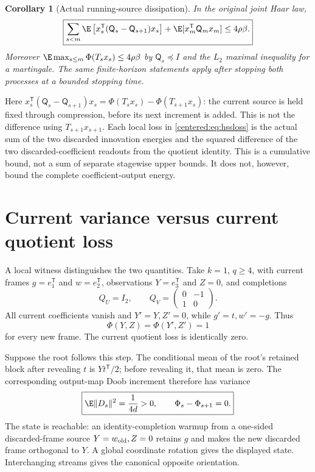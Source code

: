 \documentclass[11pt,oneside,openany,a4paper]{book}
\numberwithin{equation}{chapter}
\newtheorem{corollary}[theorem]{Corollary}
\theoremstyle{definition}
\theoremstyle{remark}
\begin{document}
\begin{corollary}[Actual running-source dissipation]\label{centered:cor:loss}
In the original joint Haar law,
\begin{equation}\label{centered:eq:hssloss}
 \boxed{\sum_{s<m}\E\left[x_s^{\mathsf T}(\mathsf Q_s-\mathsf Q_{s+1})x_s\right]
 +\E[x_m^{\mathsf T}\mathsf Q_mx_m]\le4\rho\beta.}
\end{equation}
Moreover $\E\max_{s\le m}\Phi(T_sx_s)\le4\rho\beta$ by $\mathsf Q_s\preceq I$ and the $L_2$ maximal inequality for a martingale. The same finite-horizon statements apply after stopping both processes at a bounded stopping time.
\end{corollary}

Here $x_s^{\mathsf T}(\mathsf Q_s-\mathsf Q_{s+1})x_s=\Phi(T_sx_s)-\Phi(T_{s+1}x_s)$: the current source is held fixed through compression, before its next increment is added. This is not the difference using $T_{s+1}x_{s+1}$. Each local loss in \eqref{centered:eq:hssloss} is the actual sum of the two discarded innovation energies and the squared difference of the two discarded-coefficient readouts from the quotient identity. This is a cumulative bound, not a sum of separate stagewise upper bounds. It does not, however, bound the complete coefficient-output energy.

\section{Current variance versus current quotient loss}\label{centered:sec:obstruction}
A local witness distinguishes the two quantities. Take $k=1$, $q\ge4$, with current frames $g=e_1^{\mathsf T}$ and $w=e_2^{\mathsf T}$, observations $Y=e_3^{\mathsf T}$ and $Z=0$, and completions
\[
 Q_U=I_2,\qquad
 Q_V=\begin{pmatrix}0&-1\\1&0\end{pmatrix}.
\]
All current coefficients vanish and $Y'=Y,Z'=0$, while $g'=t,w'=-g$. Thus
\[
 \Phi(Y,Z)=\Phi(Y',Z')=1
\]
for every new frame. The current quotient loss is identically zero.

Suppose the root follows this step. The conditional mean of the root's retained block after revealing $t$ is $Yt^{\mathsf T}/2$; before revealing it, that mean is zero. The corresponding output-map Doob increment therefore has variance
\begin{equation}\label{centered:eq:witness}
 \boxed{\E\|D_s\|^2=\frac1{4d}>0,\qquad \Phi_s-\Phi_{s+1}=0.}
\end{equation}
The state is reachable: an identity-completion warmup from a one-sided discarded-frame source $Y=w_{\rm old},Z=0$ retains $g$ and makes the new discarded frame orthogonal to $Y$. A global coordinate rotation gives the displayed state. Interchanging streams gives the canonical opposite orientation.
\end{document}
